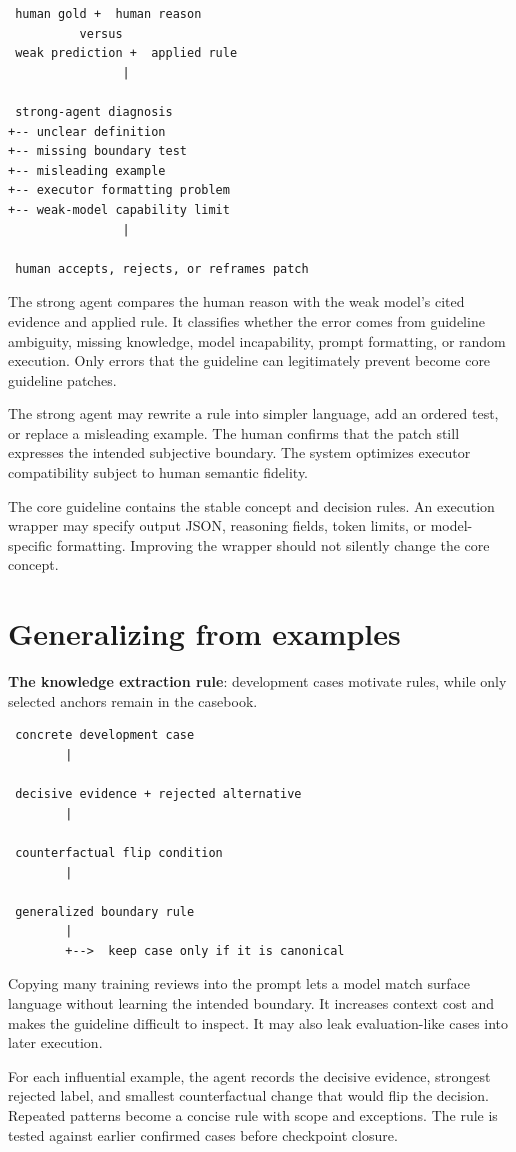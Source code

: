 \begin{verbatim}
 human gold +  human reason
          versus
 weak prediction +  applied rule
                |

 strong-agent diagnosis
+-- unclear definition
+-- missing boundary test
+-- misleading example
+-- executor formatting problem
+-- weak-model capability limit
                |

 human accepts, rejects, or reframes patch
\end{verbatim}
The strong agent compares the human reason with the weak model's cited evidence and applied rule. It classifies whether the error comes from guideline ambiguity, missing knowledge, model incapability, prompt formatting, or random execution. Only errors that the guideline can legitimately prevent become core guideline patches.

The strong agent may rewrite a rule into simpler language, add an ordered test, or replace a misleading example. The human confirms that the patch still expresses the intended subjective boundary. The system optimizes executor compatibility subject to human semantic fidelity.

The core guideline contains the stable concept and decision rules. An execution wrapper may specify output JSON, reasoning fields, token limits, or model-specific formatting. Improving the wrapper should not silently change the core concept.


\section{Generalizing from examples}
\textbf{The knowledge extraction rule}: development cases motivate rules, while only selected anchors remain in the casebook.

\begin{verbatim}
 concrete development case
        |

 decisive evidence + rejected alternative
        |

 counterfactual flip condition
        |

 generalized boundary rule
        |
        +-->  keep case only if it is canonical
\end{verbatim}
Copying many training reviews into the prompt lets a model match surface language without learning the intended boundary. It increases context cost and makes the guideline difficult to inspect. It may also leak evaluation-like cases into later execution.

For each influential example, the agent records the decisive evidence, strongest rejected label, and smallest counterfactual change that would flip the decision. Repeated patterns become a concise rule with scope and exceptions. The rule is tested against earlier confirmed cases before checkpoint closure.

